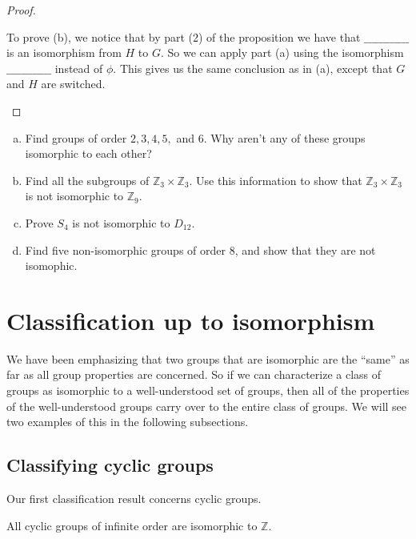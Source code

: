 \begin{proof}
\begin{exercise}
To prove (b), we notice that by part (2) of the proposition we have that $\_\_\_\_\_\_\_\_\_\_\_\_$ is an isomorphism from $H$  to $G$. So we can apply part (a) using the  isomorphism $\_\_\_\_\_\_\_\_\_\_\_\_$ instead of $\phi$. This gives us the same conclusion as in (a), except that $G$ and $H$ are switched.
\end{exercise}

\end{proof}

\begin{exercise}
\begin{enumerate}[(a)]
\item
Find groups of order $2, 3, 4, 5,$ and $6$.
Why aren't any of these groups isomorphic to each other?
\item
Find all the subgroups of ${\mathbb Z}_3 \times {\mathbb Z}_3$. Use this
information to show that ${\mathbb Z}_3 \times {\mathbb Z}_3$ is not isomorphic to ${\mathbb Z}_9$. 
\item
Prove $S_4$ is not isomorphic to $D_{12}$.
\item
Find five non-isomorphic groups of order 8, and show that they are not isomophic.
\end{enumerate}
\end{exercise}

\section{Classification up to isomorphism}
We have been emphasizing that two groups that are isomorphic are the ``same'' as far as all group properties are concerned. So if we can characterize a class of groups as isomorphic to a well-understood set of groups, then all of the properties of the well-understood groups carry over to the entire class of groups. We will see two examples of this in the following subsections.

\subsection{Classifying cyclic groups}

Our first classification result concerns cyclic groups.

\begin{thm}\label{isomorph_theorem_2}
All cyclic groups of infinite order are isomorphic to ${\mathbb Z}$.
\end{thm}

